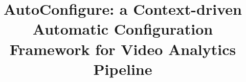 \documentclass{article}
\begin{document}
\sloppy

\def\x{{\mathbf x}}
\def\L{{\cal L}}

\title{AutoConfigure: a Context-driven Automatic Configuration Framework for Video Analytics Pipeline}
%
\address{\textsuperscript{\rm 1}Department of Computer Science and Techonology, Tsinghua University, China\\ 
\textsuperscript{\rm 2}Tsinghua Shenzhen International Graduate School, Tsinghua University, China\\
\textsuperscript{\rm 3}Tsinghua-Berkeley Shenzhen Institute, Tsinghua University, China
}

\maketitle




%
%






\end{document}
